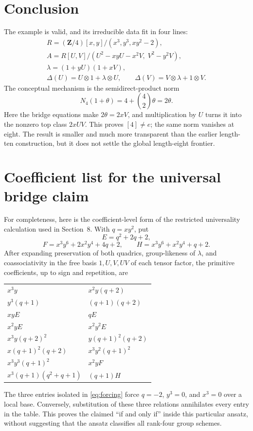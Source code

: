 \documentclass[11pt]{article}
\theoremstyle{remark}
\newcommand{\Z}{\mathbf Z}
\newcommand{\ot}{\otimes}
\begin{document}
\section{Conclusion}

The example is valid, and its irreducible data fit in four lines:
\[
 \boxed{
 \begin{gathered}
 R=(\Z/4)[x,y]/(x^3,y^3,xy^2-2),\\
 A=R[U,V]/(U^2-xyU-x^2V,\;V^2-y^2V),\\
 \lambda=(1+yU)(1+xV),\\
 \Delta(U)=U\ot1+\lambda\ot U,
 \qquad \Delta(V)=V\ot\lambda+1\ot V.
 \end{gathered}}
\]
The conceptual mechanism is the semidirect-product norm
\[
 N_4(1+\theta)=4+\binom42\theta=2\theta.
\]
Here the bridge equations make $2\theta=2xV$, and multiplication by $U$
turns it into the nonzero top class $2xUV$.  This proves
$[4]\ne e$; the same norm vanishes at eight.  The result is smaller and much
more transparent than the earlier length-ten construction, but it does not
settle the global length-eight frontier.

\appendix
\section{Coefficient list for the universal bridge claim}

For completeness, here is the coefficient-level form of the
restricted universality calculation used in Section~8.  With $q=xy^2$, put
\[
 E=q^2+2q+2,
\]
\[
 F=x^3y^6+2x^2y^4+4q+2,
 \qquad
 H=x^3y^6+x^2y^4+q+2.
\]
After expanding preservation of both quadrics, group-likeness of $\lambda$,
and coassociativity in the free basis $1,U,V,UV$ of each tensor factor, the
primitive coefficients, up to sign and repetition, are
\begin{center}
\renewcommand{\arraystretch}{1.15}
\begin{tabular}{@{}ll@{}}
\toprule
$x^3y$ & $x^2y(q+2)$\\
$y^3(q+1)$ & $(q+1)(q+2)$\\
$xyE$ & $qE$\\
$x^2yE$ & $x^2y^2E$\\
$x^3y(q+2)^2$ & $y(q+1)^2(q+2)$\\
$x(q+1)^2(q+2)$ & $x^3y^2(q+1)^2$\\
$x^3y^3(q+1)^2$ & $x^2yF$\\
$x^3(q+1)(q^2+q+1)$ & $(q+1)H$\\
\bottomrule
\end{tabular}
\end{center}
The three entries isolated in \eqref{eq:forcing} force
$q=-2$, $y^3=0$, and $x^3=0$ over a local base.  Conversely, substitution of
these three relations annihilates every entry in the table.  This proves the
claimed ``if and only if'' inside this particular ansatz, without suggesting
that the ansatz classifies all rank-four group schemes.
\end{document}

